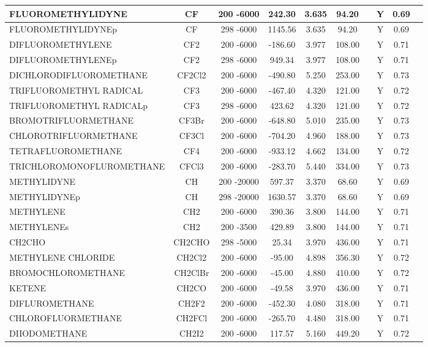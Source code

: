 \begin{longtable}{@{\extracolsep{\fill}}|l|c|c|c|c|c|c|c|c|l|}
FLUOROMETHYLIDYNE&CF&200 -6000&  242.30& 3.635&    94.20& &Y& 0.69&\\ \hline
FLUOROMETHYLIDYNEp&CF&298 -6000& 1145.56& 3.635&    94.20& &Y& 0.69&\\ \hline
DIFLUOROMETHYLENE&CF2&200 -6000& -186.60& 3.977&   108.00& &Y& 0.71&\\ \hline
DIFLUOROMETHYLENEp&CF2&298 -6000&  949.34& 3.977&   108.00& &Y& 0.71&\\ \hline
DICHLORODIFLUOROMETHANE&CF2Cl2&200 -6000& -490.80& 5.250&   253.00& &Y& 0.73&\\ \hline
TRIFLUOROMETHYL RADICAL&CF3&200 -6000& -467.40& 4.320&   121.00& &Y& 0.72&\\ \hline
TRIFLUOROMETHYL RADICALp&CF3&298 -6000&  423.62& 4.320&   121.00& &Y& 0.72&\\ \hline
BROMOTRIFLUORMETHANE&CF3Br&200 -6000& -648.80& 5.010&   235.00& &Y& 0.73&\\ \hline
CHLOROTRIFLUORMETHANE&CF3Cl&200 -6000& -704.20& 4.960&   188.00& &Y& 0.73&\\ \hline
TETRAFLUOROMETHANE&CF4&200 -6000& -933.12& 4.662&   134.00& &Y& 0.72&\\ \hline
TRICHLOROMONOFLUROMETHANE&CFCl3&200 -6000& -283.70& 5.440&   334.00& &Y& 0.73&\\ \hline
METHYLIDYNE&CH&200 -20000&  597.37& 3.370&    68.60& &Y& 0.69&\\ \hline
METHYLIDYNEp&CH&298 -20000& 1630.57& 3.370&    68.60& &Y& 0.69&\\ \hline
METHYLENE&CH2&200 -6000&  390.36& 3.800&   144.00& &Y& 0.71&\\ \hline
METHYLENEs&CH2&200 -3500&  429.89& 3.800&   144.00& &Y& 0.71&\\ \hline
CH2CHO&CH2CHO&298 -5000&   25.34& 3.970&   436.00& &Y& 0.71&\\ \hline
METHYLENE CHLORIDE&CH2Cl2&200 -6000&  -95.00& 4.898&   356.30& &Y& 0.72&\\ \hline
BROMOCHLOROMETHANE&CH2ClBr&200 -6000&  -45.00& 4.880&   410.00& &Y& 0.72&\\ \hline
KETENE&CH2CO&200 -6000&  -49.58& 3.970&   436.00& &Y& 0.71&\\ \hline
DIFLUROMETHANE&CH2F2&200 -6000& -452.30& 4.080&   318.00& &Y& 0.71&\\ \hline
CHLOROFLUORMETHANE&CH2FCl&200 -6000& -265.70& 4.480&   318.00& &Y& 0.71&\\ \hline
DIIODOMETHANE&CH2I2&200 -6000&  117.57& 5.160&   449.20& &Y& 0.72&\\ \hline

\end{longtable}
